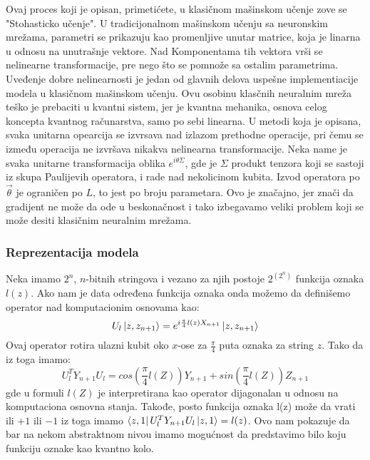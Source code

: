 \documentclass[12pt, letterpaper, oneside]{article}
\begin{document}
Ovaj proces koji je opisan, primetićete, u klasičnom mašinskom učenje zove se "Stohasticko učenje".
U tradicijonalnom mašinskom učenju sa neuronskim mrežama, parametri se prikazuju kao promenljive unutar matrice, koja je linarna u odnosu na unutrašnje vektore.
Nad Komponentama tih vektora vrši se nelinearne transformacije, pre nego što se pomnože sa ostalim parametrima. 
Uveđenje dobre nelinearnosti je jedan od glavnih delova uspešne implementiacije modela u klasičnom mašinskom učenju.
Ovu osobinu klasčnih neuralnim mreža teško je prebaciti u kvantni sistem, jer je kvantna mehanika, osnova celog koncepta kvantnog računarstva, samo po sebi linearna.
U metodi koja je opisana, svaka unitarna opearcija se izvrsava nad izlazom prethodne operacije, pri čemu se između operacija ne izvršava nikakva nelinearna transformacije.
Neka name je svaka unitarne transformacija oblika $e^{i\theta\Sigma}$, gde je $\Sigma$ produkt tenzora koji se sastoji iz skupa Paulijevih operatora, i rade nad nekolicinom kubita.
Izvod operatora po $\overrightarrow{\theta}$ je ograničen po $L$, to jest po broju parametara. Ovo je značajno, jer znači da gradijent ne može da ode u beskonačnost i tako izbegavamo 
veliki problem koji se može desiti klasičnim neuralnim mrežama.

\subsubsection{Reprezentacija modela}
Neka imamo $2^n$, $n$-bitnih stringova i vezano za njih postoje $2^{(2^n)}$ funkcija oznaka $l(z)$.
Ako nam je data određena funkcija oznaka onda možemo da definišemo operator nad komputacionim osnovama kao:
\[
    U_l\Ket{z,z_{n+1}} = e^{i\frac{\pi}{4}l(z)X_{n+1}}\Ket{z,z_{n+1}}
\]
Ovaj operator rotira ulazni kubit oko $x$-ose za $\frac{\pi}{4}$ puta oznaka za string $z$.
Tako da iz toga imamo:
\[
    U_l^TY_{n+1}U_l = cos(\frac{\pi}{4}l(Z))Y_{n+1} + sin(\frac{\pi}{4}l(Z))Z_{n+1}
\]
gde u formuli $l(Z)$ je interpretirana kao operator dijagonalan u odnosu na komputaciona osnovna stanja.
Takođe, posto funkcija oznaka l(z) može da vrati ili $+1$ ili $-1$ iz toga imamo $\bra{z,1}U_l^TY_{n+1}U_l\ket{z,1} = l(z)$.
Ovo nam pokazuje da bar na nekom abstraktnom nivou imamo mogućnost da predstavimo bilo koju funkciju oznake kao kvantno kolo.
\end{document}
